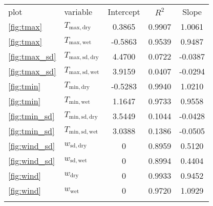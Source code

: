 \begin{tabular}{llccc}
\tophline
              plot &                                       variable & Intercept &  $R^2$ &   Slope \\
\middlehline
 \ref{fig:tmax} &  $T_{\mathrm{max}, \mathrm{dry}}$ & 0.3865 & 0.9907 & 1.0061 \\
 \ref{fig:tmax} &  $T_{\mathrm{max}, \mathrm{wet}}$ & -0.5863 & 0.9539 & 0.9487 \\
 \ref{fig:tmax_sd} &  $T_{\mathrm{max}, \mathrm{sd}, \mathrm{dry}}$ & 4.4700 & 0.0722 & -0.0387 \\
 \ref{fig:tmax_sd} &  $T_{\mathrm{max}, \mathrm{sd}, \mathrm{wet}}$ & 3.9159 & 0.0407 & -0.0294 \\
 \ref{fig:tmin} &  $T_{\mathrm{min}, \mathrm{dry}}$ & -0.5283 & 0.9940 & 1.0210 \\
 \ref{fig:tmin} &  $T_{\mathrm{min}, \mathrm{wet}}$ & 1.1647 & 0.9733 & 0.9558 \\
 \ref{fig:tmin_sd} &  $T_{\mathrm{min}, \mathrm{sd}, \mathrm{dry}}$ & 3.5449 & 0.1044 & -0.0428 \\
 \ref{fig:tmin_sd} &  $T_{\mathrm{min}, \mathrm{sd}, \mathrm{wet}}$ & 3.0388 & 0.1386 & -0.0505 \\
 \ref{fig:wind_sd} &  $w_{\mathrm{sd}, \mathrm{dry}}$ & 0 & 0.8959 & 0.5120 \\
 \ref{fig:wind_sd} &  $w_{\mathrm{sd}, \mathrm{wet}}$ & 0 & 0.8994 & 0.4404 \\
 \ref{fig:wind} &  $w_{\mathrm{dry}}$ & 0 & 0.9933 & 0.9452 \\
 \ref{fig:wind} &  $w_{\mathrm{wet}}$ & 0 & 0.9720 & 1.0929 \\
\bottomhline
\end{tabular}

